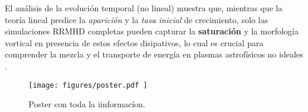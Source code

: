 El análisis de la evolución temporal (no lineal) muestra que, mientras que la teoría lineal predice la \textit{aparición} y la \textit{tasa inicial} de crecimiento, solo las simulaciones RRMHD completas pueden capturar la \textbf{saturación} y la morfología vortical en presencia de estos efectos disipativos, lo cual es crucial para comprender la mezcla y el transporte de energía en plasmas astrofísicos no ideales \cite{336, 444}.

\begin{figure}[H]
    \centering
    \texttt{[image: figures/poster.pdf ]}

    \caption{Poster con toda la iinformacíon.}
\end{figure}



